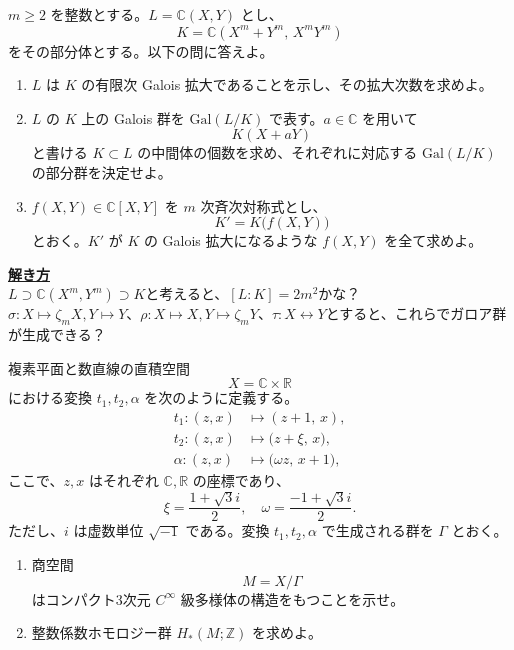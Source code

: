 \documentclass[11pt]{article}
\begin{document}
\begin{tcolorbox}[mybox={東大専門　問4？}]
$m \ge 2$ を整数とする。$L = \mathbb{C}(X,Y)$ とし、
\[
K = \mathbb{C}(X^m + Y^m,\, X^m Y^m)
\]
をその部分体とする。以下の問に答えよ。
\begin{enumerate}
\item
$L$ は $K$ の有限次 Galois 拡大であることを示し、その拡大次数を求めよ。
\item
$L$ の $K$ 上の Galois 群を $\mathrm{Gal}(L/K)$ で表す。$a \in \mathbb{C}$ を用いて
\[
K(X + aY)
\]
と書ける $K \subset L$ の中間体の個数を求め、それぞれに対応する $\mathrm{Gal}(L/K)$ の部分群を決定せよ。
\item
$f(X,Y) \in \mathbb{C}[X,Y]$ を $m$ 次斉次対称式とし、
\[
K' = K\bigl(f(X,Y)\bigr)
\]
とおく。$K'$ が $K$ の Galois 拡大になるような $f(X,Y)$ を全て求めよ。
\end{enumerate}
\end{tcolorbox}

\underline{\textbf{解き方}}\\
$L \supset \mathbb{C}(X^m , Y^m) \supset K$と考えると、$[L:K]=2m^2$かな？\\
$\sigma : X \mapsto \zeta_m X , Y \mapsto Y$、$\rho : X \mapsto X , Y \mapsto \zeta_m Y$、$\tau : X \longleftrightarrow Y$とすると、これらでガロア群が生成できる？\\


\begin{tcolorbox}[mybox={東大専門　問？}]
複素平面と数直線の直積空間
\[
X = \mathbb{C} \times \mathbb{R}
\]
における変換 $t_1, t_2, \alpha$ を次のように定義する。
\[
\begin{aligned}
t_1: (z,x) &\mapsto (z+1,\,x),\\
t_2: (z,x) &\mapsto \bigl(z+\xi,\,x\bigr),\\
\alpha: (z,x) &\mapsto \bigl(\omega z,\,x+1\bigr),
\end{aligned}
\]
ここで、$z, x$ はそれぞれ $\mathbb{C}, \mathbb{R}$ の座標であり、
\[
\xi = \frac{1 + \sqrt{3}i}{2}, \quad \omega = \frac{-1 + \sqrt{3}i}{2}.
\]
ただし、$i$ は虚数単位 $\sqrt{-1}$ である。変換 $t_1, t_2, \alpha$ で生成される群を $\Gamma$ とおく。

\begin{enumerate}
\item
商空間
\[
M = X / \Gamma
\]
はコンパクト3次元 $C^\infty$ 級多様体の構造をもつことを示せ。
\item
整数係数ホモロジー群 $H_*(M;\mathbb{Z})$ を求めよ。
\end{enumerate}
\end{tcolorbox}
\end{document}
